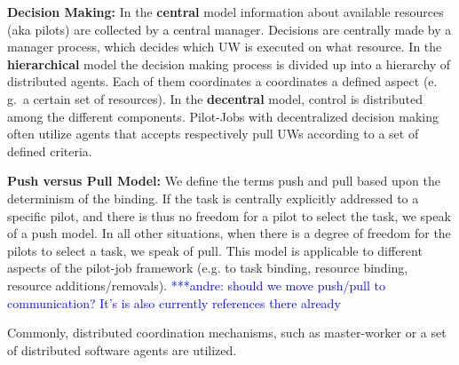 \documentclass[conference,final]{IEEEtran}
\newcommand{\alnote}[1]{ {\textcolor{blue} { ***andre: #1 }}}
\newcommand{\alnote}[1]{}
\begin{document}
\begin{compactitem}
\item \textbf{Decision Making:} In the \textbf{central} model
  information about available resources (aka pilots) are collected by
  a central manager.  Decisions are centrally made by a manager
  process, which decides which UW is executed on what resource. In the
  \textbf{hierarchical} model the decision making process is divided
  up into a hierarchy of distributed agents. Each of them coordinates
  a coordinates a defined aspect (e.\,g.\ a certain set of
  resources). In the \textbf{decentral} model, control is distributed
  among the different components. Pilot-Jobs with decentralized
  decision making often utilize agents that accepts respectively pull
  UWs according to a set of defined criteria.

\item \textbf{Push versus Pull Model:} We define the terms push and
  pull based upon the determinism of the binding. If the task is
  centrally explicitly addressed to a specific pilot, and there is
  thus no freedom for a pilot to select the task, we speak of a push
  model. In all other situations, when there is a degree of freedom
  for the pilots to select a task, we speak of pull. This model is
  applicable to different aspects of the pilot-job framework (e.g. to
  task binding, resource binding, resource additions/removals).
  \alnote{should we move push/pull to communication? It's is also
    currently references there already}

\end{compactitem}

Commonly, distributed coordination mechanisms, such as master-worker
or a set of distributed software agents are utilized.

\end{document}
